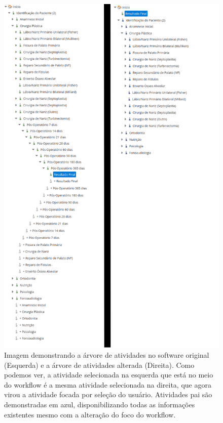 \begin{figure}
    \centering
    \includegraphics[height=1\textwidth]{imgs/CENTRARE/arvoreNormalEAlterada.png}
    \caption{Imagem demonstrando a árvore de atividades no software original (Esquerda) e a árvore de atividades alterada (Direita). Como podemos ver, a atividade selecionada na esquerda que está no meio do workflow é a mesma atividade selecionada na direita, que agora virou a atividade focada por seleção do usuário. Atividades pai são demonstradas em azul, disponibilizando todas as informações existentes mesmo com a alteração do foco do workflow.}
    \label{fig:centrare_tree_normal_altered}
\end{figure}